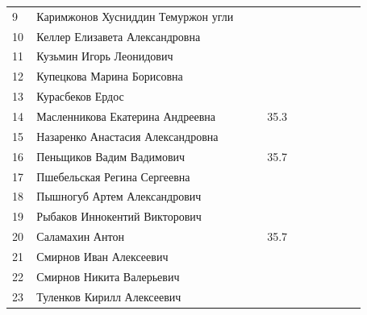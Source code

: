 \documentclass[a4paper,landscape,11pt]{article}
\newcommand*\ok{&{\small \ding{51}}} %
\newcommand*\no{&{\small }} %
\begin{document}
\begin{tabular}{p{7pt}|l|p{\CS}|p{\CS}|p{\CT}|p{\CS}|p{\CS}|p{\CS}|p{\CS}|p{\CS}|p{\CS}}
9\,&   Каримжонов Хусниддин Темуржон угли \no\no\no  \ok&&&&\\
10\,&  Келлер Елизавета Александровна     \ok\ok\ok  \ok&&&\\
\midrule
11\,&  Кузьмин Игорь Леонидович           \ok\no\no  \ok&&&&\\ 
12\,&  Купецкова Марина Борисовна         \ok\no\no  \ok&&&&\\
13\,&  Курасбеков Ердос                   \ok\no\no  \ok&&&&\\
14\,&  Масленникова Екатерина Андреевна   \ok\ok&35.3\ok&&&&\\
15\,&  Назаренко Анастасия Александровна  \ok\no\no  \no&&&&\\
\midrule
16\,&  Пеньщиков Вадим Вадимович          \no\no&35.7\no&&&&\\
17\,&  Пшебельская Регина Сергеевна       \ok\no\no  \ok&&&&\\ 
18\,&  Пышногуб Артем Александрович       \ok\no\no  \no&&&&\\
19\,&  Рыбаков Иннокентий Викторович      \no\no\no  \no&&&&\\
20\,&  Саламахин Антон                    \ok\no&35.7\ok&&&&\\
\midrule
21\,&  Смирнов Иван Алексеевич            \no\no\no  \ok&&&&\\
22\,&  Смирнов Никита Валерьевич          \no\no\no  \no&&&&\\
23\,&  Туленков Кирилл Алексеевич         \ok\no\no  \no&&&&\\
\bottomrule
\end{tabular} 
\end{document}

